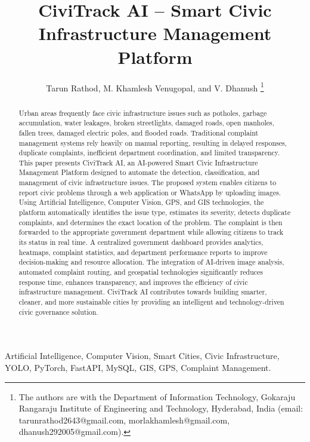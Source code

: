 \documentclass[journal]{IEEEtran}
\begin{document}
\title{CiviTrack AI -- Smart Civic Infrastructure Management Platform}

\author{
Tarun Rathod, M. Khamlesh Venugopal, and V. Dhanush
\thanks{The authors are with the Department of Information Technology, Gokaraju Rangaraju Institute of Engineering and Technology, Hyderabad, India (email: tarunrathod2643@gmail.com, morlakhamlesh@gmail.com, dhanush292005@gmail.com).}
}

\maketitle

\begin{abstract}
Urban areas frequently face civic infrastructure issues such as potholes, garbage accumulation, water leakages, broken streetlights, damaged roads, open manholes, fallen trees, damaged electric poles, and flooded roads. Traditional complaint management systems rely heavily on manual reporting, resulting in delayed responses, duplicate complaints, inefficient department coordination, and limited transparency. This paper presents CiviTrack AI, an AI-powered Smart Civic Infrastructure Management Platform designed to automate the detection, classification, and management of civic infrastructure issues. The proposed system enables citizens to report civic problems through a web application or WhatsApp by uploading images. Using Artificial Intelligence, Computer Vision, GPS, and GIS technologies, the platform automatically identifies the issue type, estimates its severity, detects duplicate complaints, and determines the exact location of the problem. The complaint is then forwarded to the appropriate government department while allowing citizens to track its status in real time. A centralized government dashboard provides analytics, heatmaps, complaint statistics, and department performance reports to improve decision-making and resource allocation. The integration of AI-driven image analysis, automated complaint routing, and geospatial technologies significantly reduces response time, enhances transparency, and improves the efficiency of civic infrastructure management. CiviTrack AI contributes towards building smarter, cleaner, and more sustainable cities by providing an intelligent and technology-driven civic governance solution.
\end{abstract}

\begin{IEEEkeywords}
Artificial Intelligence, Computer Vision, Smart Cities, Civic Infrastructure, YOLO, PyTorch, FastAPI, MySQL, GIS, GPS, Complaint Management.
\end{IEEEkeywords}
\end{document}
